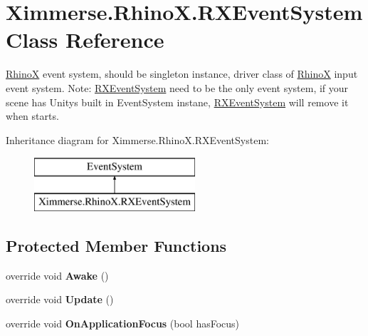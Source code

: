\hypertarget{class_ximmerse_1_1_rhino_x_1_1_r_x_event_system}{}\section{Ximmerse.\+Rhino\+X.\+R\+X\+Event\+System Class Reference}
\label{class_ximmerse_1_1_rhino_x_1_1_r_x_event_system}


\mbox{\hyperlink{namespace_ximmerse_1_1_rhino_x}{RhinoX}} event system, should be singleton instance, driver class of \mbox{\hyperlink{namespace_ximmerse_1_1_rhino_x}{RhinoX}} input event system. Note\+: \mbox{\hyperlink{class_ximmerse_1_1_rhino_x_1_1_r_x_event_system}{R\+X\+Event\+System}} need to be the only event system, if your scene has Unity\textquotesingle{}s built in Event\+System instane, \mbox{\hyperlink{class_ximmerse_1_1_rhino_x_1_1_r_x_event_system}{R\+X\+Event\+System}} will remove it when starts.  


Inheritance diagram for Ximmerse.\+Rhino\+X.\+R\+X\+Event\+System\+:\begin{figure}[H]
\begin{center}
\leavevmode
\includegraphics[height=2.000000cm]{class_ximmerse_1_1_rhino_x_1_1_r_x_event_system}
\end{center}
\end{figure}
\subsection*{Protected Member Functions}
\begin{DoxyCompactItemize}
\item 
\mbox{\label{class_ximmerse_1_1_rhino_x_1_1_r_x_event_system_afff01ad9feb8e0a4257fbcaf5fe908d3}} 
override void {\bfseries Awake} ()
\item 
\mbox{\label{class_ximmerse_1_1_rhino_x_1_1_r_x_event_system_ad4eb777be634608e7cb3668e6773bad4}} 
override void {\bfseries Update} ()
\item 
\mbox{\label{class_ximmerse_1_1_rhino_x_1_1_r_x_event_system_a8d8a80f01e2361e2be206d6cc9d5a58f}} 
override void {\bfseries On\+Application\+Focus} (bool has\+Focus)
\end{DoxyCompactItemize}


